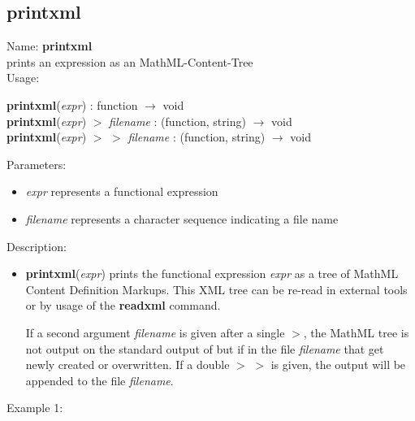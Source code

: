 \subsection{printxml}
\label{labprintxml}
\noindent Name: \textbf{printxml}\\
prints an expression as an MathML-Content-Tree\\
\noindent Usage: 
\begin{center}
\textbf{printxml}(\emph{expr}) : \textsf{function} $\rightarrow$ \textsf{void}
\\ 
\textbf{printxml}(\emph{expr}) $>$ \emph{filename} : (\textsf{function}, \textsf{string}) $\rightarrow$ \textsf{void}
\\ 
\textbf{printxml}(\emph{expr}) $>$ $>$ \emph{filename} : (\textsf{function}, \textsf{string}) $\rightarrow$ \textsf{void}
\\ 
\end{center}
Parameters: 
\begin{itemize}
\item \emph{expr} represents a functional expression
\item \emph{filename} represents a character sequence indicating a file name
\end{itemize}
\noindent Description: \begin{itemize}

\item \textbf{printxml}(\emph{expr}) prints the functional expression \emph{expr} as a tree of
   MathML Content Definition Markups. This XML tree can be re-read in
   external tools or by usage of the \textbf{readxml} command.
    
   If a second argument \emph{filename} is given after a single $>$, the
   MathML tree is not output on the standard output of \sollya but if in
   the file \emph{filename} that get newly created or overwritten. If a double
   $>$ $>$ is given, the output will be appended to the file \emph{filename}.
\end{itemize}
\noindent Example 1: 
